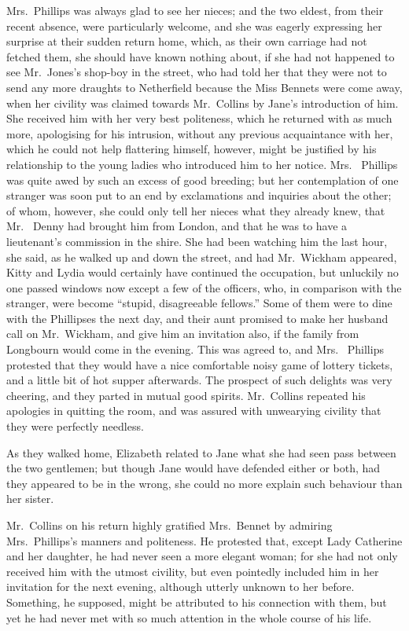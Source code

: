 Mrs.\ Phillips was always glad to see her nieces; and the two
eldest, from their recent absence, were particularly welcome, and
she was eagerly expressing her surprise at their sudden return
home, which, as their own carriage had not fetched them, she
should have known nothing about, if she had not happened to
see Mr.\ Jones's shop-boy in the street, who had told her that
they were not to send any more draughts to Netherfield because
the Miss Bennets were come away, when her civility was
claimed towards Mr.\ Collins by Jane's introduction of him.  She
received him with her very best politeness, which he returned
with as much more, apologising for his intrusion, without any
previous acquaintance with her, which he could not help
flattering himself, however, might be justified by his relationship
to the young ladies who introduced him to her notice.  Mrs.\ %
Phillips was quite awed by such an excess of good breeding; but
her contemplation of one stranger was soon put to an end by
exclamations and inquiries about the other; of whom, however,
she could only tell her nieces what they already knew, that Mr.\ %
Denny had brought him from London, and that he was to have a
lieutenant's commission in the \gdash{}shire.  She had been watching
him the last hour, she said, as he walked up and down the street,
and had Mr.\ Wickham appeared, Kitty and Lydia would certainly
have continued the occupation, but unluckily no one passed
windows now except a few of the officers, who, in comparison
with the stranger, were become ``stupid, disagreeable fellows.''
Some of them were to dine with the Phillipses the next day, and
their aunt promised to make her husband call on Mr.\ Wickham,
and give him an invitation also, if the family from Longbourn
would come in the evening.  This was agreed to, and Mrs.\ %
Phillips protested that they would have a nice comfortable noisy
game of lottery tickets, and a little bit of hot supper afterwards.
The prospect of such delights was very cheering, and they parted
in mutual good spirits.  Mr.\ Collins repeated his apologies in
quitting the room, and was assured with unwearying civility that
they were perfectly needless.

As they walked home, Elizabeth related to Jane what she had
seen pass between the two gentlemen; but though Jane would
have defended either or both, had they appeared to be in the
wrong, she could no more explain such behaviour than her sister.

Mr.\ Collins on his return highly gratified Mrs.\ Bennet by
admiring Mrs.\ Phillips's manners and politeness.  He protested
that, except Lady Catherine and her daughter, he had never seen
a more elegant woman; for she had not only received him with
the utmost civility, but even pointedly included him in her
invitation for the next evening, although utterly unknown to her
before.  Something, he supposed, might be attributed to his
connection with them, but yet he had never met with so much
attention in the whole course of his life.



